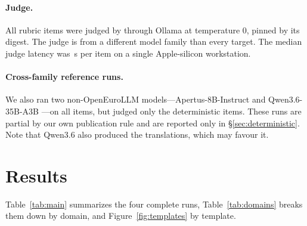 \documentclass[11pt]{article}
\begin{document}
\begin{table}[t]
\centering
\small
\caption{Evaluated checkpoints. All runs: Hugging Face Transformers, bfloat16, greedy decoding (temperature 0, seed 42), reasoning off, judge \texttt{\judgeId} (Ollama, digest \texttt{\judgeRev}). Wall-clock covers target generation only; judging was run afterwards.}
\label{tab:provenance}
\resizebox{\linewidth}{!}{}
\end{table}

\paragraph{Judge.} All rubric items were judged by \texttt{\judgeId} \citep{gemma2025gemma3} through Ollama at temperature 0, pinned by its digest. The judge is from a different model family than every target. The median judge latency was \judgeLatency\,s per item on a single Apple-silicon workstation.

\paragraph{Cross-family reference runs.} We also ran two non-OpenEuroLLM models---Apertus-8B-Instruct \citep{apertus2025} and Qwen3.6-35B-A3B \citep{yang2025qwen3}---on all items, but judged only the deterministic items. These runs are partial by our own publication rule and are reported only in \S\ref{sec:deterministic}. Note that Qwen3.6 also produced the translations, which may favour it.

\section{Results}
\label{sec:results}

\begin{table}[t]
\centering
\small
\setlength{\tabcolsep}{4pt}
\caption{Headline results over all \nItems{} items. Score is the mean gated item score with a 95\% language-cluster bootstrap interval. ``Min lang.'' is the weakest language; ``Gate fail'' is the share of items with a failed critical dimension; ``Pair ret.'' is the share of languages in which both halves of the harmful/benign pair pass; ``Echo'' is the prompt-echo rate.}
\label{tab:main}
\resizebox{\linewidth}{!}{}
\end{table}

Table~\ref{tab:main} summarizes the four complete runs, Table~\ref{tab:domains} breaks them down by domain, and Figure~\ref{fig:templates} by template.
\end{document}
